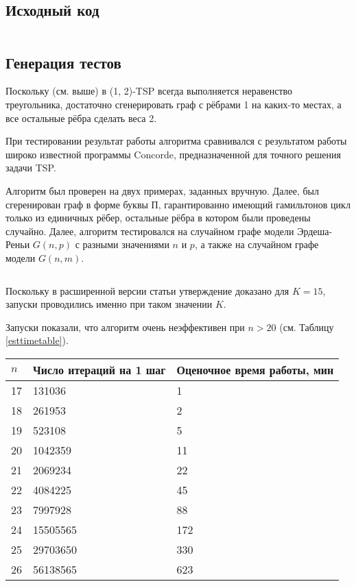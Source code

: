 \subsection{Исходный код}
\inputminted{python}{k-improv.py}
\subsection{Генерация тестов}
Поскольку (см. выше) в (1, 2)-TSP всегда выполняется неравенство треугольника, достаточно сгенерировать граф с рёбрами 1 на каких-то местах, а все остальные рёбра сделать веса 2.

При тестировании результат работы алгоритма сравнивался с результатом работы широко известной программы Concorde, предназначенной для точного решения задачи TSP.

Алгоритм был проверен на двух примерах, заданных вручную. Далее, был сгеренирован граф в форме буквы П, гарантированно имеющий гамильтонов цикл только из единичных рёбер, остальные рёбра в котором были проведены случайно. Далее, алгоритм тестировался на случайном графе модели Эрдеша-Реньи $G(n, p)$ с разными значениями $n$ и $p$, а также на случайном графе модели $G(n, m)$.

\inputminted{python}{erdos-renyi.py}

Поскольку в расширенной версии статьи утверждение доказано для $K=15$, запуски проводились именно при таком значении $K$.

Запуски показали, что алгоритм очень неэффективен при $n>20$ (см. Таблицу \ref{esttimetable}).

\begin{center}
\begin{tabular}{|l|l|l|}
\hline
$n$ & Число итераций на 1 шаг & Оценочное время работы, мин \\ \hline
17 & 131036 & 1\\ \hline
18 & 261953 & 2\\ \hline
19 & 523108 & 5\\ \hline
20 & 1042359 & 11\\ \hline
21 & 2069234 & 22\\ \hline
22 & 4084225 & 45\\ \hline
23 & 7997928 & 88\\ \hline
24 & 15505565 & 172\\ \hline
25 & 29703650 & 330\\ \hline
26 & 56138565 & 623\\ \hline
\end{tabular}
 \label{esttimetable}
\end{center}



